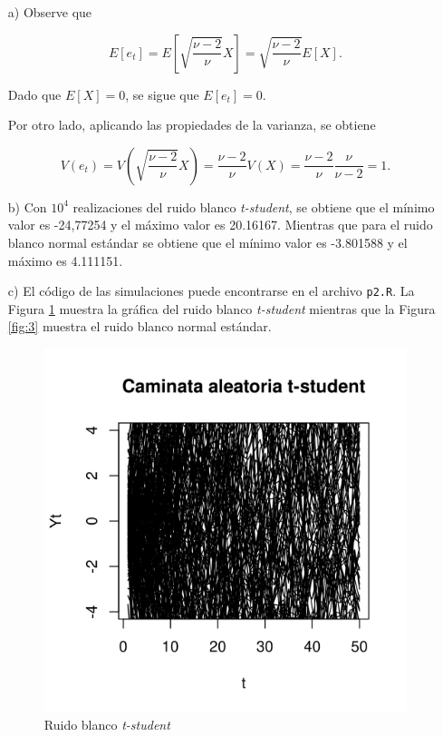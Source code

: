 \documentclass[11pt,letterpaper]{article}
\begin{document}
	\begin{itemize}
		\item[a)] Observe que 
		
		\[
		E[e_t] = E \left[ \sqrt{\frac{\nu - 2}{\nu}}X \right] 
		= \sqrt{\frac{\nu - 2}{\nu}} E[X] \text{.}
		\]
		
		Dado que $E[X] = 0$, se sigue que $E[e_t] = 0$.
		
		Por otro lado, aplicando las propiedades de la varianza, se obtiene
		
		\[
		V(e_t) = V\left( \sqrt{\frac{\nu - 2}{\nu}}X \right) 
		= \frac{\nu - 2}{\nu}V(X) = \frac{\nu - 2}{\nu} \frac{\nu}{\nu - 2} = 1 \text{.}
		\]
		
		\item[b)] Con $10^4$ realizaciones del ruido blanco \textit{t-student}, se obtiene que el mínimo valor es -24,77254 y el máximo valor es 20.16167. Mientras que para el ruido blanco normal estándar se obtiene que el mínimo valor es -3.801588 y el máximo es 4.111151.
		
		\item[c)] El código de las simulaciones puede encontrarse en el archivo \texttt{p2.R}. La Figura \ref{fig:2} muestra la gráfica del ruido blanco \textit{t-student} mientras que la Figura \ref{fig:3} muestra el ruido blanco normal estándar.
		
		\begin{figure}[!t]
			\centering
			\includegraphics[width=0.6\linewidth]{../img/rb_et.png}
			\caption{Ruido blanco \textit{t-student}}
			\label{fig:2}
		\end{figure}
		

\end{itemize}
\end{document}
